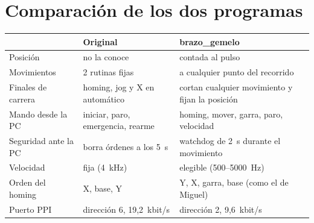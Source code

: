 \section{Comparación de los dos programas}
\begin{center}\small
\begin{tabularx}{\linewidth}{>{\raggedright}p{4cm} >{\raggedright}X >{\raggedright\arraybackslash}X}
\toprule
& \textbf{Original} & \textbf{brazo\_gemelo}\\
\midrule
Posición & no la conoce & contada al pulso\\
Movimientos & 2 rutinas fijas & a cualquier punto del recorrido\\
Finales de carrera & homing, jog y X en automático & cortan cualquier movimiento y fijan la posición\\
Mando desde la PC & iniciar, paro, emergencia, rearme & homing, mover, garra, paro, velocidad\\
Seguridad ante la PC & borra órdenes a los 5~s & watchdog de 2~s durante el movimiento\\
Velocidad & fija (4~kHz) & elegible (500--5000~Hz)\\
Orden del homing & X, base, Y & Y, X, garra, base (como el de Miguel)\\
Puerto PPI & dirección 6, 19,2~kbit/s & dirección 2, 9,6~kbit/s\\
\bottomrule
\end{tabularx}
\end{center}
